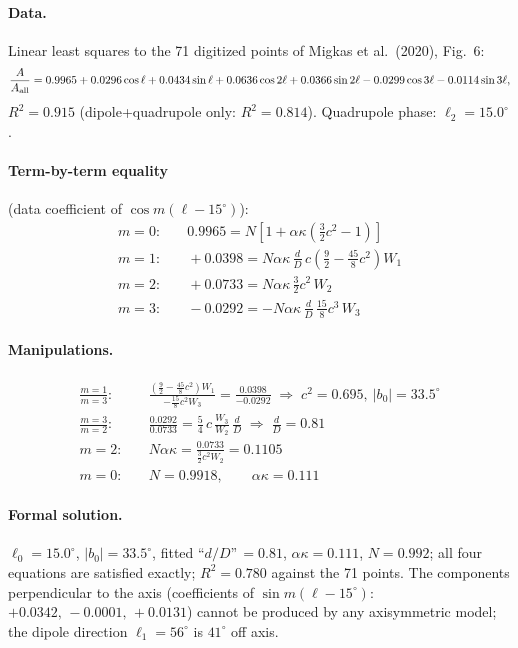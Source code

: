 \documentclass[11pt]{article}
\begin{document}
\paragraph{Data.} Linear least squares to the 71 digitized points of Migkas et al.\ (2020), Fig.~6:
\begin{equation}
\frac{A}{A_{\rm all}} = 0.9965 + 0.0296\cos\ell + 0.0434\sin\ell + 0.0636\cos2\ell + 0.0366\sin2\ell - 0.0299\cos3\ell - 0.0114\sin3\ell,
\end{equation}
$R^2=0.915$ (dipole+quadrupole only: $R^2=0.814$). Quadrupole phase: $\ell_2=15.0^\circ$.

\paragraph{Term-by-term equality} (data coefficient of $\cos m(\ell-15^\circ)$):
\begin{align}
m=0:&\quad 0.9965 = N\left[1+\alpha\kappa\left(\tfrac32c^2-1\right)\right]\\
m=1:&\quad +0.0398 = N\alpha\kappa\,\frac{d}{D}\,c\left(\tfrac92-\tfrac{45}{8}c^2\right)W_1\\
m=2:&\quad +0.0733 = N\alpha\kappa\,\tfrac32c^2\,W_2\\
m=3:&\quad -0.0292 = -N\alpha\kappa\,\frac{d}{D}\,\tfrac{15}{8}c^3\,W_3
\end{align}

\paragraph{Manipulations.}
\begin{align}
\frac{m=1}{m=3}:&\quad \frac{\left(\tfrac92-\tfrac{45}{8}c^2\right)W_1}{-\tfrac{15}{8}c^2W_3}=\frac{0.0398}{-0.0292}
\;\Rightarrow\; c^2=0.695,\ |b_0|=33.5^\circ\\
\frac{m=3}{m=2}:&\quad \frac{0.0292}{0.0733}=\tfrac54\,c\,\frac{W_3}{W_2}\,\frac{d}{D}
\;\Rightarrow\; \frac{d}{D}=0.81\\
m=2:&\quad N\alpha\kappa=\frac{0.0733}{\tfrac32c^2W_2}=0.1105\\
m=0:&\quad N=0.9918,\qquad \alpha\kappa=0.111
\end{align}

\paragraph{Formal solution.} $\ell_0=15.0^\circ$, $|b_0|=33.5^\circ$, fitted ``$d/D$''$\,=0.81$, $\alpha\kappa=0.111$, $N=0.992$;
all four equations are satisfied exactly; $R^2=0.780$ against the 71 points.
The components perpendicular to the axis (coefficients of $\sin m(\ell-15^\circ)$: $+0.0342,\,-0.0001,\,+0.0131$)
cannot be produced by any axisymmetric model; the dipole direction $\ell_1=56^\circ$ is $41^\circ$ off axis.
\end{document}
